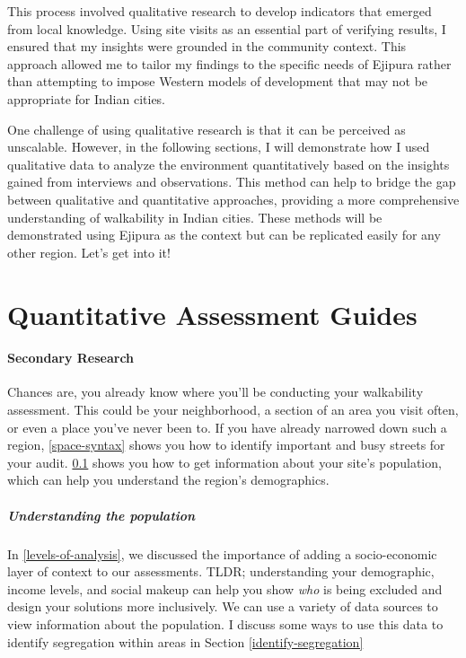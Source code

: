 \documentclass[
]{latex/krantz}
\begin{document}
This process involved qualitative research to develop indicators that emerged from local knowledge. Using site visits as an essential part of verifying results, I ensured that my insights were grounded in the community context. This approach allowed me to tailor my findings to the specific needs of Ejipura rather than attempting to impose Western models of development that may not be appropriate for Indian cities.

One challenge of using qualitative research is that it can be perceived as unscalable. However, in the following sections, I will demonstrate how I used qualitative data to analyze the environment quantitatively based on the insights gained from interviews and observations. This method can help to bridge the gap between qualitative and quantitative approaches, providing a more comprehensive understanding of walkability in Indian cities. These methods will be demonstrated using Ejipura as the context but can be replicated easily for any other region. Let's get into it!

\hypertarget{part-quantitative-assessment-guides}{%
\part{Quantitative Assessment Guides}\label{part-quantitative-assessment-guides}}

\hypertarget{secondary-research}{%
\subsection{Secondary Research}\label{secondary-research}}

Chances are, you already know where you'll be conducting your walkability assessment. This could be your neighborhood, a section of an area you visit often, or even a place you've never been to. If you have already narrowed down such a region, \ref{space-syntax} shows you how to identify important and busy streets for your audit. \ref{secondary-research} shows you how to get information about your site's population, which can help you understand the region's demographics.

\hypertarget{understanding-the-population}{%
\subsubsection{Understanding the population}\label{understanding-the-population}}

In \ref{levels-of-analysis}, we discussed the importance of adding a socio-economic layer of context to our assessments. TLDR; understanding your demographic, income levels, and social makeup can help you show \emph{who} is being excluded and design your solutions more inclusively. We can use a variety of data sources to view information about the population. I discuss some ways to use this data to identify segregation within areas in Section \ref{identify-segregation}
\end{document}
